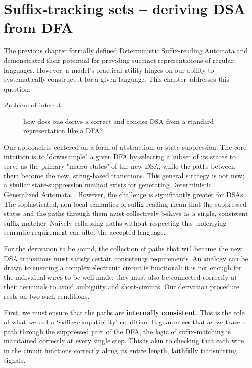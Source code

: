 
\chapter{Suffix-tracking sets -- deriving DSA from DFA}
\label{sec:suffix-tracking-sets}

The previous chapter formally defined Deterministic Suffix-reading Automata and demonstrated their potential for providing succinct representations of regular languages. However, a model's practical utility hinges on our ability to systematically construct it for a given language. This chapter addresses this question: 

\begin{description}
\item[Problem of interest.] how does one derive a correct and concise DSA from a standard representation like a DFA?
\end{description}

Our approach is centered on a form of abstraction, or state suppression. The core intuition is to "downsample" a given DFA by selecting a subset of its states to serve as the primary "macro-states" of the new DSA, while the paths between them become the new, string-based transitions. This general strategy is not new; a similar state-suppression method exists for generating Deterministic Generalized Automata~\cite{giammarresi1999deterministic}. However, the challenge is significantly greater for DSAs. The sophisticated, non-local semantics of suffix-reading mean that the suppressed states and the paths through them must collectively behave as a single, consistent suffix-matcher. Naively collapsing paths without respecting this underlying semantic requirement can alter the accepted language.

For the derivation to be sound, the collection of paths that will become the new DSA transitions must satisfy certain consistency requirements. An analogy can be drawn to ensuring a complex electronic circuit is functional: it is not enough for the individual wires to be well-made; they must also be connected correctly at their terminals to avoid ambiguity and short-circuits. Our derivation procedure rests on two such conditions.

First, we must ensure that the paths are \textbf{internally consistent}. This is the role of what we call a `suffix-compatibility' condition. It guarantees that as we trace a path through the suppressed part of the DFA, the logic of suffix-matching is maintained correctly at every single step. This is akin to checking that each wire in the circuit functions correctly along its entire length, faithfully transmitting signals.

